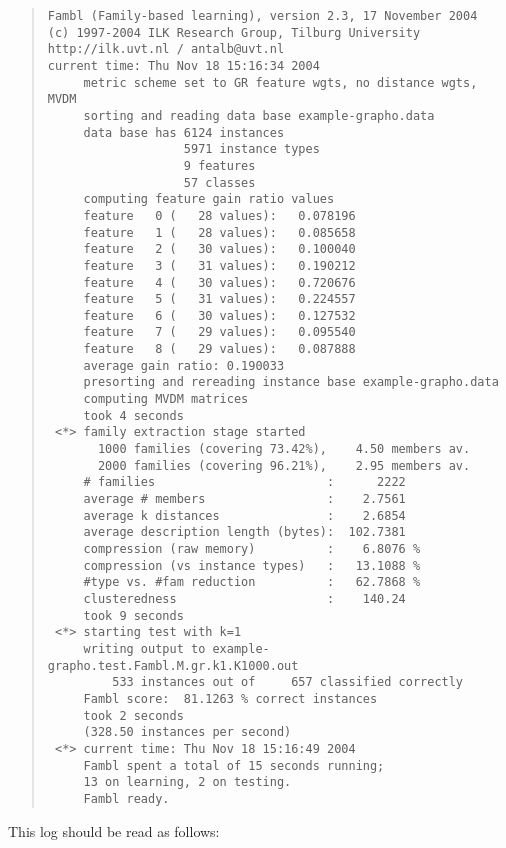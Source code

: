 \documentclass[11pt]{article}
\begin{document}
\begin{quote}
{\tiny
\begin{verbatim}
Fambl (Family-based learning), version 2.3, 17 November 2004
(c) 1997-2004 ILK Research Group, Tilburg University
http://ilk.uvt.nl / antalb@uvt.nl
current time: Thu Nov 18 15:16:34 2004
     metric scheme set to GR feature wgts, no distance wgts, MVDM
     sorting and reading data base example-grapho.data
     data base has 6124 instances
                   5971 instance types
                   9 features
                   57 classes
     computing feature gain ratio values
     feature   0 (   28 values):   0.078196
     feature   1 (   28 values):   0.085658
     feature   2 (   30 values):   0.100040
     feature   3 (   31 values):   0.190212
     feature   4 (   30 values):   0.720676
     feature   5 (   31 values):   0.224557
     feature   6 (   30 values):   0.127532
     feature   7 (   29 values):   0.095540
     feature   8 (   29 values):   0.087888
     average gain ratio: 0.190033
     presorting and rereading instance base example-grapho.data
     computing MVDM matrices
     took 4 seconds
 <*> family extraction stage started
       1000 families (covering 73.42%),    4.50 members av.
       2000 families (covering 96.21%),    2.95 members av.
     # families                        :      2222
     average # members                 :    2.7561
     average k distances               :    2.6854
     average description length (bytes):  102.7381
     compression (raw memory)          :    6.8076 %
     compression (vs instance types)   :   13.1088 %
     #type vs. #fam reduction          :   62.7868 %
     clusteredness                     :    140.24
     took 9 seconds
 <*> starting test with k=1
     writing output to example-grapho.test.Fambl.M.gr.k1.K1000.out
         533 instances out of     657 classified correctly
     Fambl score:  81.1263 % correct instances
     took 2 seconds
     (328.50 instances per second)
 <*> current time: Thu Nov 18 15:16:49 2004
     Fambl spent a total of 15 seconds running;
     13 on learning, 2 on testing.
     Fambl ready.
\end{verbatim}
}
\end{quote}

This log should be read as follows:
\end{document}
